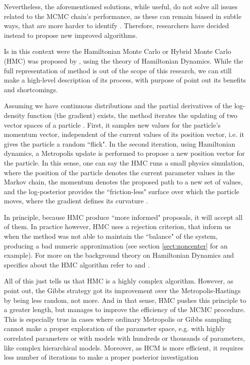 Nevertheless, the aforementioned solutions, while useful, do not solve all issues related to the MCMC chain's performance, as these can remain biased in subtle ways, that are more harder to identify \cite{McElreath_2020}. Therefore, researchers have decided instead to propose new improved algorithms. 

Is in this context were the Hamiltonian Monte Carlo or Hybrid Monte Carlo (HMC) was proposed by \citet{Duane_et_al_1987}, using the theory of Hamiltonian Dynamics. While the full representation of method is out of the scope of this research, we can still make a high-level description of its process, with purpose of point out its benefits and shortcomings. 

Assuming we have continuous distributions and the partial derivatives of the log-density function (the gradient) exists, the method iterates the updating of two vector spaces of a particle \cite{Neal_2011, McElreath_2020}. First, it samples new values for the particle's momentum vector, independent of the current values of its position vector, i.e. it gives the particle a random ``flick". In the second iteration, using Hamiltonian dynamics, a Metropolis update is performed to propose a new position vector for the particle. In this sense, one can say the HMC runs a small physics simulation, where the position of the particle denotes the current parameter values in the Markov chain, the momentum denotes the proposed path to a new set of values, and the log-posterior provides the ``friction-less" surface over which the particle moves, where the gradient defines its curvature \cite{McElreath_2020}.

In principle, because HMC produce ``more informed" proposals, it will accept all of them. In practice however, HMC uses a rejection criterion, that inform us when the method was not able to maintain the ``balance" of the system, producing a bad numeric approximation (see section \ref{sect:noncenter} for an example). For more on the background theory on Hamiltonian Dynamics and specifics about the HMC algorithm refer to \citet{Neal_2011} and \citet{Betancourt_et_al_2013}.

All of this just tells us that HMC is a highly complex algorithm. However, as \citet{McElreath_2020} point out, the Gibbs strategy got its improvement over the Metropolis-Hastings by being less random, not more. And in that sense, HMC pushes this principle to a greater length, but manages to improve the efficiency of the MCMC procedure. This is especially true in cases where ordinary Metropolis or Gibbs sampling cannot make a proper exploration of the parameter space, e.g. with highly correlated parameters or with models with hundreds or thousands of parameters, like complex hierarchical models. Moreover, as HCM is more efficient, it requires less number of iterations to make a proper posterior investigation \cite{McElreath_2020, Gelman_et_al_2014} 


